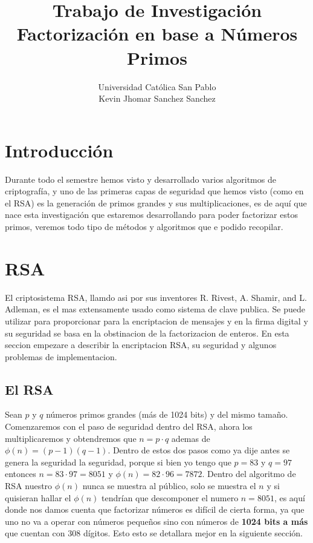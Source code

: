 \documentclass[11pt, conference]{IEEEtran}
\begin{document}
	\title{\bf Trabajo de Investigación Factorización en base a Números Primos}
	\author{Universidad Católica San Pablo \\ Kevin Jhomar Sanchez Sanchez}
	\maketitle
	
	\tableofcontents 
	\bigskip\bigskip\bigskip\bigskip
	\pagebreak
\section{Introducción}
Durante todo el semestre hemos visto y desarrollado varios algoritmos de criptografía, y uno de las primeras capas de seguridad  que hemos visto (como en el RSA) es la generación de primos grandes y sus multiplicaciones, es de aquí que nace esta investigación que estaremos desarrollando para poder factorizar estos primos, veremos todo tipo de métodos y algoritmos que e podido recopilar.

\section{RSA}
El criptosistema RSA, llamdo asi por sus inventores R. Rivest, A. Shamir, and L. Adleman, es el mas extensamente usado como sistema de clave publica. Se puede utilizar para proporcionar para la encriptacion de mensajes y en la firma digital y su seguridad se basa en la obstinacion de la factorizacion de enteros. En esta seccion empezare a describir la encriptacion RSA, su seguridad y algunos problemas  de implementacion.

\subsection[El RSA]{\textbf{El RSA}}
Sean $p$ y $q$ números primos grandes (más de 1024 bits) y del mismo tamaño. Comenzaremos con el paso de seguridad dentro del RSA, ahora los multiplicaremos y obtendremos que $n = p\cdot q$ ademas de $\phi(n) = (p-1)(q-1)$. Dentro de estos dos pasos como ya dije antes se genera la seguridad la seguridad, porque si bien yo tengo que $p=83$ y $q = 97$ entonces $n = 83\cdot 97 = 8051$ y $\phi(n) = 82\cdot 96 = 7872$. Dentro del algoritmo de RSA nuestro $\phi(n)$ nunca se muestra al público, solo se muestra el $n$ y si quisieran hallar el $\phi(n)$ tendrían que descomponer el numero $n = 8051$, es aquí donde nos damos cuenta que factorizar números es difícil de cierta forma, ya que uno no va a operar con números pequeños sino con números de \textbf{1024 bits a más} que cuentan con 308 dígitos. Esto esto se detallara mejor en la siguiente sección.
\end{document}
